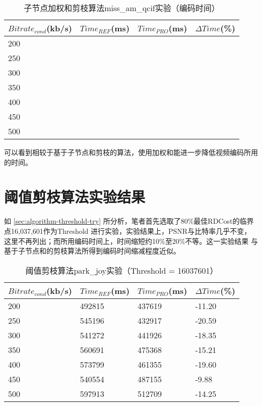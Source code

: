 \begin{table}[H]
  \centering
    \caption{子节点加权和剪枝算法miss\_am\_qcif实验（编码时间）}
    \label{tab:result-weighted-miss-time}
    \begin{tabularx}{\linewidth}{XXXX}
      \toprule[1.5pt]
      $Bitrate_{cond}$(kb/s) & $Time_{REF}$(ms) & $Time_{PRO}$(ms) & $\Delta Time$(\%) \\
      \midrule[1pt]
      200 &  &  &   \\
      250 &  &  &  \\
      300 &  &  &  \\
      350 &  &  &  \\
      400 &  &  &   \\
      450 &  &  &  \\
      500 &  &  &  \\
      \bottomrule[1.5pt]
    \end{tabularx}
\end{table}


可以看到相较于基于子节点和剪枝的算法，使用加权和能进一步降低视频编码所用的时间。



\section{阈值剪枝算法实验结果}

如 \ref{sec:algorithm-threshold-try} 所分析，笔者首先选取了80\%最佳RDCost的临界点16,037,601作为Threshold
进行实验，实验结果上，PSNR与比特率几乎不变，这里不再列出；而所用编码时间上，时间缩短约10\%至20\%不等。这一实验结果
与基于子节点和的剪枝算法所得到编码时间缩减程度近似。

\begin{table}[H]
  \centering
    \caption{阈值剪枝算法park\_joy实验（Threshold = 16037601）}
    \label{tab:result-threshold-park-time}
    \begin{tabularx}{\linewidth}{XXXX}
      \toprule[1.5pt]
      $Bitrate_{cond}$(kb/s) & $Time_{REF}$(ms) & $Time_{PRO}$(ms) & $\Delta Time$(\%) \\
      \midrule[1pt]
      200 & 492815 & 437619 & -11.20  \\
      250 & 545196 & 432917 & -20.59 \\
      300 & 541272 & 441926 & -18.35  \\
      350 & 560691 & 475368 & -15.21 \\
      400 & 573799 & 461355 & -19.60  \\
      450 & 540554 & 487155 & -9.88 \\
      500 & 597913 & 512709 & -14.25  \\
      \bottomrule[1.5pt]
    \end{tabularx}
\end{table}


